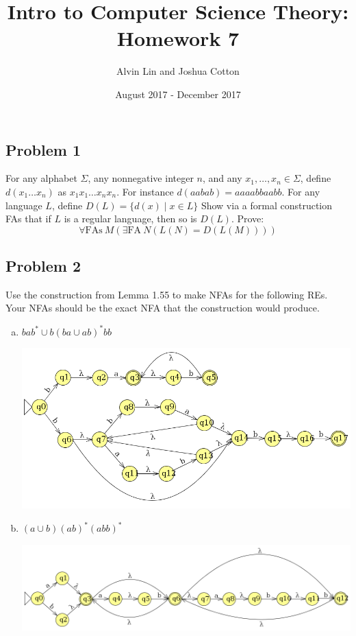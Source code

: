 \documentclass{math}
\title{Intro to Computer Science Theory: Homework 7}
\author{Alvin Lin and Joshua Cotton}
\date{August 2017 - December 2017}
\begin{document}
\maketitle

\subsection*{Problem 1}
For any alphabet \( \Sigma \), any nonnegative integer \( n \), and any
\( x_1,\dots,x_n\in\Sigma \), define \( d(x_1\dots x_n) \) as
\( x_1x_1\dots x_nx_n \). For instance \( d(aabab) = aaaabbaabb \). For
any language \( L \), define \( D(L) = \{d(x)\mid x\in L\} \) Show via
a formal construction FAs that if \( L \) is a regular language, then so
is \( D(L) \). Prove:
\[ \forall\text{FAs}~M(\exists\text{FA}~N(L(N) = D(L(M)))) \]


\subsection*{Problem 2}
Use the construction from Lemma 1.55 to make NFAs for the following REs. Your
NFAs should be the exact NFA that the construction would produce.
\begin{enumerate}[(a)]
  \item \( bab^*\cup b(ba\cup ab)^*bb \)
  \begin{center}
    \includegraphics[width=16cm]{assets/hw_7_2a.png}
  \end{center}
  \item \( (a\cup b)(ab)^*(abb)^* \)
  \begin{center}
    \includegraphics[width=16cm]{assets/hw_7_2b.png}
  \end{center}
\end{enumerate}
\end{document}
